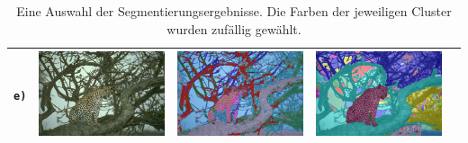\begin{table}[h!]
\begin{tabularx}{\textwidth}{>{\centering}m{}
			>{\centering}m{}
			>{\centering}m{}
			>{\centering}m{}
			>{\centering\arraybackslash}m{}}
		\texttt{e)} &
		\includegraphics[width=0.9\linewidth]{images/bsd/134035.jpg} &
		\includegraphics[width=0.9\linewidth]{images/gen/bsd_results/134035.jpg_seg.png} &
		\includegraphics[width=0.9\linewidth]{images/gen/bsd_results/134035.jpg_gt_1.png} \\
		\bottomrule
	\end{tabularx}
	\caption{Eine Auswahl der Segmentierungsergebnisse. Die Farben der jeweiligen Cluster wurden zufällig gewählt.}
	\label{tab:images_bsds500}
\end{table}

